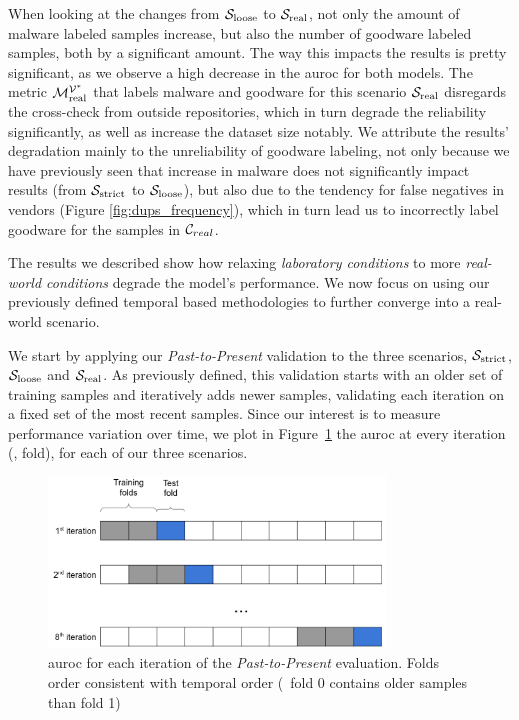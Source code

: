 \todo[inline]{}

When looking at the changes from $\mathcal{S}_{\mathrm{loose}}$ to $\mathcal{S}_{\mathrm{real}}$, not only the amount of malware labeled samples increase, but also the number of goodware labeled samples, both by a significant amount. 
The way this impacts the results is pretty significant, as we observe a high decrease in the \gls{auroc} for both models.
The metric $\mathcal{M}_{\mathrm{real}}^{\mathcal{V}^*}$ that labels malware and goodware for this scenario $\mathcal{S}_{\mathrm{real}}$ disregards the cross-check from outside repositories, which in turn degrade the reliability significantly, as well as increase the dataset size notably.
We attribute the results' degradation mainly to the unreliability of goodware labeling, not only because we have previously seen that increase in malware does not significantly impact results (from $\mathcal{S}_{\mathrm{strict}}$ to $\mathcal{S}_{\mathrm{loose}}$), but also due to the tendency for false negatives in vendors (Figure \ref{fig:dups_frequency}), which in turn lead us to incorrectly label goodware for the samples in $\mathcal{C}_{real}$.

The results we described show how relaxing \textit{laboratory conditions} to more \textit{real-world conditions} degrade the model's performance.
We now focus on using our previously defined temporal based methodologies to further converge into a real-world scenario.

\medskip

We start by applying our \textit{Past-to-Present} validation to the three scenarios, $\mathcal{S}_{\mathrm{strict}}$, $\mathcal{S}_{\mathrm{loose}}$ and $\mathcal{S}_{\mathrm{real}}$.
As previously defined, this validation starts with an older set of training samples and iteratively adds newer samples, validating each iteration on a fixed set of the most recent samples.
Since our interest is to measure performance variation over time, we plot in Figure~\ref{fig:pastpresent} the \gls{auroc} at every iteration (\ie, fold), for each of our three scenarios.

\begin{figure}[!htb]
	\centering
	\includegraphics[width=0.8\textwidth]{Figures/dia_slidingwindow.png}
	\caption[Single layer results for static features in \textit{Past-to-Present}.]{\gls{auroc} for each iteration of the \textit{Past-to-Present} evaluation. Folds order consistent with temporal order (\ie\ fold 0 contains older samples than
		fold 1)}
	\label{fig:pastpresent}
\end{figure}

